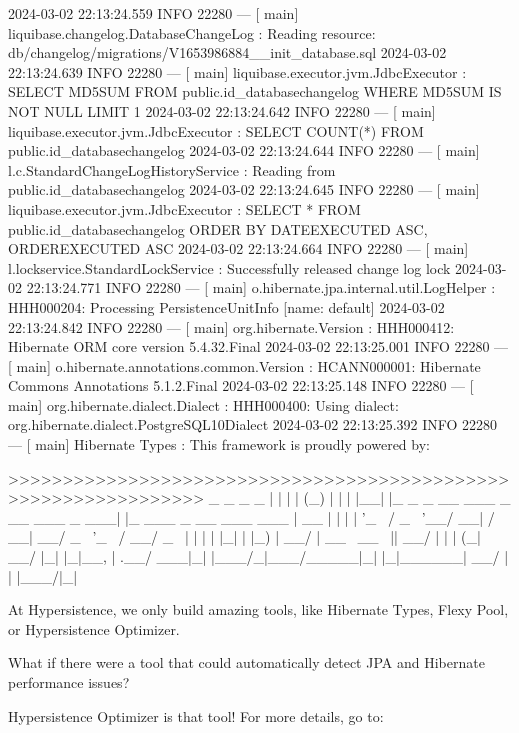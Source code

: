 2024-03-02 22:13:24.559  INFO 22280 --- [           main] liquibase.changelog.DatabaseChangeLog    : Reading resource: db/changelog/migrations/V1653986884__init_database.sql
2024-03-02 22:13:24.639  INFO 22280 --- [           main] liquibase.executor.jvm.JdbcExecutor      : SELECT MD5SUM FROM public.id_databasechangelog WHERE MD5SUM IS NOT NULL LIMIT 1
2024-03-02 22:13:24.642  INFO 22280 --- [           main] liquibase.executor.jvm.JdbcExecutor      : SELECT COUNT(*) FROM public.id_databasechangelog
2024-03-02 22:13:24.644  INFO 22280 --- [           main] l.c.StandardChangeLogHistoryService      : Reading from public.id_databasechangelog
2024-03-02 22:13:24.645  INFO 22280 --- [           main] liquibase.executor.jvm.JdbcExecutor      : SELECT * FROM public.id_databasechangelog ORDER BY DATEEXECUTED ASC, ORDEREXECUTED ASC
2024-03-02 22:13:24.664  INFO 22280 --- [           main] l.lockservice.StandardLockService        : Successfully released change log lock
2024-03-02 22:13:24.771  INFO 22280 --- [           main] o.hibernate.jpa.internal.util.LogHelper  : HHH000204: Processing PersistenceUnitInfo [name: default]
2024-03-02 22:13:24.842  INFO 22280 --- [           main] org.hibernate.Version                    : HHH000412: Hibernate ORM core version 5.4.32.Final
2024-03-02 22:13:25.001  INFO 22280 --- [           main] o.hibernate.annotations.common.Version   : HCANN000001: Hibernate Commons Annotations {5.1.2.Final}
2024-03-02 22:13:25.148  INFO 22280 --- [           main] org.hibernate.dialect.Dialect            : HHH000400: Using dialect: org.hibernate.dialect.PostgreSQL10Dialect
2024-03-02 22:13:25.392  INFO 22280 --- [           main] Hibernate Types                          : This framework is proudly powered by:

>>>>>>>>>>>>>>>>>>>>>>>>>>>>>>>>>>>>>>>>>>>>>>>>>>>>>>>>>>>>>>>>
 _    _                           _     _
| |  | |                         (_)   | |
| |__| |_   _ _ __   ___ _ __ ___ _ ___| |_ ___ _ __   ___ ___
|  __  | | | | '_ \ / _ \ '__/ __| / __| __/ _ \ '_ \ / __/ _ \
| |  | | |_| | |_) |  __/ |  \__ \ \__ \ ||  __/ | | | (_|  __/
|_|  |_|\__, | .__/ \___|_|  |___/_|___/\__\___|_| |_|\___\___|
         __/ | |
        |___/|_|

At Hypersistence, we only build amazing tools, like Hibernate Types, Flexy Pool, or Hypersistence Optimizer.

What if there were a tool that could automatically detect JPA and Hibernate performance issues?

Hypersistence Optimizer is that tool! For more details, go to: 

